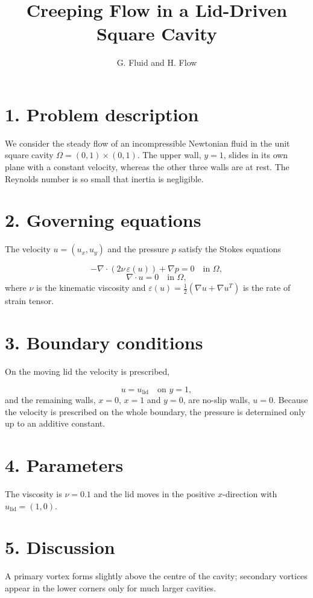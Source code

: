 \documentclass[11pt,a4paper]{article}
\title{Creeping Flow in a Lid-Driven Square Cavity}\author{G. Fluid and H. Flow}\date{}
\begin{document}
\maketitle
\section*{1. Problem description}
We consider the steady flow of an incompressible Newtonian fluid in the unit square cavity $\Omega=(0,1)\times(0,1)$. The upper wall, $y=1$, slides in its own plane with a constant velocity, whereas the other three walls are at rest. The Reynolds number is so small that inertia is negligible.

\section*{2. Governing equations}
The velocity $u=(u_x,u_y)$ and the pressure $p$ satisfy the Stokes equations

\begin{equation}
-\nabla\cdot\left(2\nu\,\varepsilon(u)\right) + \nabla p = 0 \quad \text{in } \Omega,
\end{equation}
\begin{equation}
\nabla\cdot u = 0 \quad \text{in } \Omega,
\end{equation}
where $\nu$ is the kinematic viscosity and $\varepsilon(u)=\tfrac12(\nabla u+\nabla u^{T})$ is the rate of strain tensor.

\section*{3. Boundary conditions}
On the moving lid the velocity is prescribed,

\begin{equation}
u = u_{\mathrm{lid}} \quad \text{on } y=1 ,
\end{equation}
and the remaining walls, $x=0$, $x=1$ and $y=0$, are no-slip walls, $u=0$. Because the velocity is prescribed on the whole boundary, the pressure is determined only up to an additive constant.

\section*{4. Parameters}
The viscosity is $\nu=0.1$ and the lid moves in the positive $x$-direction with $u_{\mathrm{lid}}=(1,0)$.

\section*{5. Discussion}
A primary vortex forms slightly above the centre of the cavity; secondary vortices appear in the lower corners only for much larger cavities.
\end{document}
